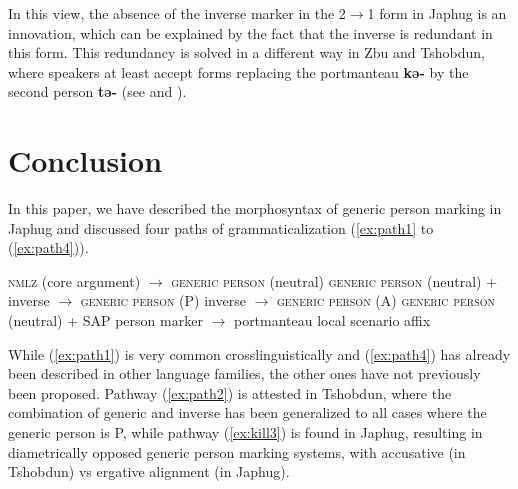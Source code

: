 \documentclass[oneside,a4paper,11pt]{article}
\newcommand{\ipa}[1]{\textbf{\phon\mbox{#1}}} %
\newcommand{\refb}[1]{(\ref{#1})}
\begin{document}
In this view, the absence of the inverse marker in the  2$\rightarrow$1 form in Japhug is an innovation, which can be explained by the fact that the inverse is redundant in this form. This redundancy is solved in a different way in Zbu and Tshobdun, where speakers at least accept forms replacing the portmanteau \ipa{kə-} by the second person \ipa{tə-} (see \citealt{jackson02rentongdengdi} and \citealt{gongxun14agreement}).
 
\section{Conclusion}
In this paper, we have described the morphosyntax of generic person marking in Japhug and discussed four paths of grammaticalization (\ref{ex:path1} to \refb{ex:path4}).


\begin{exe}
\ex \label{ex:path1}
\glt  \textsc{nmlz} (core argument) $\rightarrow$ \textsc{generic person} (neutral)
\ex \label{ex:path2}
\glt  \textsc{generic person} (neutral) + inverse  $\rightarrow$ \textsc{generic person} (P)
\ex \label{ex:path3}
\glt inverse  $\rightarrow$ \textsc{generic person} (A)
\ex \label{ex:path4}
\glt  \textsc{generic person} (neutral) + SAP person marker  $\rightarrow$ portmanteau local scenario affix
\end{exe}

While \refb{ex:path1} is very common crosslinguistically and \refb{ex:path4} has already been described in other language families, the other ones have not previously been proposed. Pathway \refb{ex:path2} is attested in Tshobdun, where the combination of generic and inverse has been generalized to all cases where the generic person is P, while pathway \refb{ex:kill3} is found in Japhug, resulting in diametrically opposed generic person marking systems, with accusative (in Tshobdun) vs ergative alignment (in Japhug).



\end{document}
